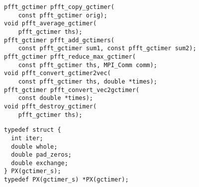 \begin{lstlisting}
pfft_gctimer pfft_copy_gctimer(
    const pfft_gctimer orig);
void pfft_average_gctimer(
    pfft_gctimer ths);
pfft_gctimer pfft_add_gctimers(
    const pfft_gctimer sum1, const pfft_gctimer sum2);
pfft_gctimer pfft_reduce_max_gctimer(
    const pfft_gctimer ths, MPI_Comm comm);
void pfft_convert_gctimer2vec(
    const pfft_gctimer ths, double *times);
pfft_gctimer pfft_convert_vec2gctimer(
    const double *times);
void pfft_destroy_gctimer(
    pfft_gctimer ths);
\end{lstlisting}

\begin{lstlisting}
typedef struct {
  int iter;
  double whole;
  double pad_zeros;
  double exchange;
} PX(gctimer_s);
typedef PX(gctimer_s) *PX(gctimer);
\end{lstlisting}



